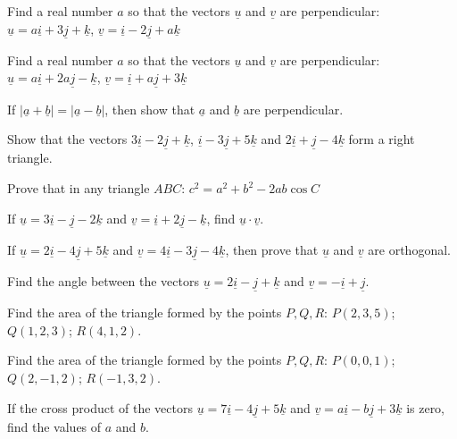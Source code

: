 \documentclass[11pt,a4paper]{article}
\begin{document}
\begin{shortlist}
\item Find a real number $a$ so that the vectors $\underline{u}$ and $\underline{v}$ are perpendicular: $\underline{u}=a\underline{i}+3\underline{j}+\underline{k}$, $\underline{v}=\underline{i}-2\underline{j}+a\underline{k}$

\item Find a real number $a$ so that the vectors $\underline{u}$ and $\underline{v}$ are perpendicular: $\underline{u}=a\underline{i}+2a\underline{j}-\underline{k}$, $\underline{v}=\underline{i}+a\underline{j}+3\underline{k}$

\item If $|\underline{a}+\underline{b}|=|\underline{a}-\underline{b}|$, then show that $\underline{a}$ and $\underline{b}$ are perpendicular.

\item Show that the vectors $3\underline{i}-2\underline{j}+\underline{k}$, $\underline{i}-3\underline{j}+5\underline{k}$ and $2\underline{i}+\underline{j}-4\underline{k}$ form a right triangle.

\item Prove that in any triangle $ABC$: $c^2=a^2+b^2-2ab\cos C$

\item If $\underline{u}=3\underline{i}-\underline{j}-2\underline{k}$ and $\underline{v}=\underline{i}+2\underline{j}-\underline{k}$, find $\underline{u}\cdot\underline{v}$.

\item If $\underline{u}=2\underline{i}-4\underline{j}+5\underline{k}$ and $\underline{v}=4\underline{i}-3\underline{j}-4\underline{k}$, then prove that $\underline{u}$ and $\underline{v}$ are orthogonal.

\item Find the angle between the vectors $\underline{u}=2\underline{i}-\underline{j}+\underline{k}$ and $\underline{v}=-\underline{i}+\underline{j}$.

\item Find the area of the triangle formed by the points $P,Q,R$: $P(2,3,5)$; $Q(1,2,3)$; $R(4,1,2)$.

\item Find the area of the triangle formed by the points $P,Q,R$: $P(0,0,1)$; $Q(2,-1,2)$; $R(-1,3,2)$.

\item If the cross product of the vectors $\underline{u}=7\underline{i}-4\underline{j}+5\underline{k}$ and $\underline{v}=a\underline{i}-b\underline{j}+3\underline{k}$ is zero, find the values of $a$ and $b$.


\end{shortlist}
\end{document}

